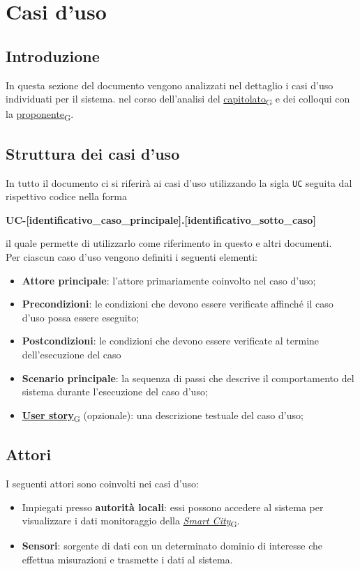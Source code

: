 \section{Casi d'uso}
\subsection{Introduzione}
In questa sezione del documento vengono analizzati nel dettaglio i casi d'uso individuati per il sistema.
nel corso dell'analisi del \href{https://7last.github.io/docs/rtb/documentazione-interna/glossario\#capitolato}{capitolato\textsubscript{G}} e dei colloqui con la \href{https://7last.github.io/docs/rtb/documentazione-interna/glossario\#proponente}{proponente\textsubscript{G}}.

\subsection{Struttura dei casi d'uso}
In tutto il documento ci si riferirà ai casi d'uso utilizzando la sigla \texttt{UC} seguita dal rispettivo codice nella forma
\begin{center}
	\textbf{UC-[identificativo\_caso\_principale].[identificativo\_sotto\_caso]}
\end{center}

il quale permette di utilizzarlo come riferimento in questo e altri documenti.\\
Per ciascun caso d'uso vengono definiti i seguenti elementi:
\begin{itemize}
	\item \textbf{Attore principale}: l'attore primariamente coinvolto nel caso d'uso;
	\item \textbf{Precondizioni}: le condizioni che devono essere verificate affinché il caso d'uso possa essere
	      eseguito;
	\item \textbf{Postcondizioni}: le condizioni che devono essere verificate al termine dell'esecuzione del caso
	\item \textbf{Scenario principale}: la sequenza di passi che descrive il comportamento del sistema durante
	      l'esecuzione del caso d'uso;
	\item \href{https://7last.github.io/docs/rtb/documentazione-interna/glossario\#user-story}{\textbf{User story}\textsubscript{G}} (opzionale): una descrizione testuale del caso d'uso;
\end{itemize}


\subsection{Attori}
I seguenti attori sono coinvolti nei casi d'uso:
\begin{itemize}
	\item Impiegati presso \textbf{autorità locali}: essi possono accedere al sistema per visualizzare i dati
	      monitoraggio della \href{https://7last.github.io/docs/rtb/documentazione-interna/glossario\#smart-city}{\textit{Smart City}\textsubscript{G}}.
	\item \textbf{Sensori}: sorgente di dati con un determinato dominio di interesse che effettua misurazioni
	      e trasmette i dati al sistema.
\end{itemize}

